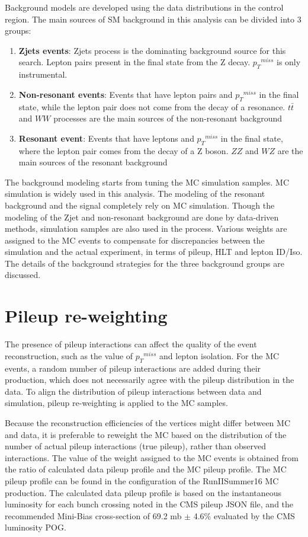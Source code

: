 Background models are developed using the data distributions in the control region. The main sources of SM background in this analysis can be divided into 3 groups:
\begin{enumerate}
\item \textbf{Zjets events}: Zjets process is the dominating background source for this search. Lepton pairs present in the final state from the Z decay. ${p_{T}}^{miss}$ is only instrumental.
\item \textbf{Non-resonant events}: Events that have lepton pairs and ${p_{T}}^{miss}$ in the final state, while the lepton pair does not come from the decay of a resonance. $t\bar{t}$ and $WW$ processes are the main sources of the non-resonant background
\item \textbf{Resonant event}: Events that have leptons and ${p_{T}}^{miss}$ in the final state, where the lepton pair comes from the decay of a Z boson. $ZZ$ and $WZ$ are the main sources of the resonant background
\end{enumerate}

\vspace{0.3cm}
The background modeling starts from tuning the MC simulation samples. MC simulation is widely used in this analysis. The modeling of the resonant background and the signal completely rely on MC simulation. Though the modeling of the Zjet and non-resonant background are done by data-driven methods, simulation samples are also used in the process. Various weights are assigned to the MC events to compensate for discrepancies between the simulation and the actual experiment, in terms of pileup, HLT and lepton ID/Iso. The details of the background strategies for the three background groups are discussed.

\section{Pileup re-weighting}
The presence of pileup interactions can affect the quality of the event reconstruction, such as the value of ${p_{T}}^{miss}$ and lepton isolation. For the MC events, a random number of pileup interactions are added during their production, which does not necessarily agree with the pileup distribution in the data. To align the distribution of pileup interactions between data and simulation, pileup re-weighting is applied to the MC samples. 

\vspace{0.3cm}
Because the reconstruction efficiencies of the vertices might differ between MC and data, it is preferable to reweight the MC based on the distribution of the number of actual pileup interactions (true pileup), rather than observed interactions. The value of the weight assigned to the MC events is obtained from the ratio of calculated data pileup profile and the MC pileup profile. The MC pileup profile can be found in the configuration of the RunIISummer16 MC production. The calculated data pileup profile is based on the instantaneous luminosity for each bunch crossing noted in the CMS pileup JSON file, and the recommended Mini-Bias cross-section of 69.2 mb $\pm$ 4.6\% evaluated by the CMS luminosity POG.

